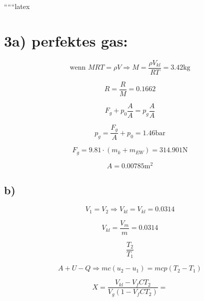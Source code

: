 
``````latex

\section*{3a) perfektes gas:}

\begin{equation*}
\text{wenn } MRT = \rho V \Rightarrow M = \frac{\rho V_{kl}}{RT} = 3.42 \text{kg}
\end{equation*}

\begin{equation*}
R = \frac{R}{M} = 0.1662
\end{equation*}

\begin{equation*}
F_g + p_0 \frac{A}{A} = p_g \frac{A}{A}
\end{equation*}

\begin{equation*}
p_g = \frac{F_g}{A} + p_0 = 1.46 \text{bar}
\end{equation*}

\begin{equation*}
F_g = 9.81 \cdot (m_k + m_{EW}) = 314.901 \text{N}
\end{equation*}

\begin{equation*}
A = 0.00785 \text{m}^2
\end{equation*}

\subsection*{b)}

\begin{equation*}
V_1 = V_2 \Rightarrow V_{kl} = V_{kl} = 0.0314
\end{equation*}

\begin{equation*}
V_{kl} = \frac{V_m}{m} = 0.0314
\end{equation*}

\begin{equation*}
\frac{T_2}{T_1}
\end{equation*}

\begin{equation*}
A + U - Q \Rightarrow m c (u_2 - u_1) = m c p (T_2 - T_1)
\end{equation*}

\begin{equation*}
X = \frac{V_{kl} - V_{f} C T_2}{V_{g} (1 - V_{f} C T_2)} =
\end{equation*}

